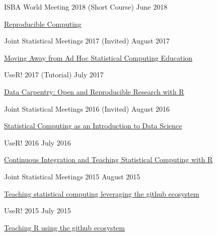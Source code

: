 \documentclass[margin,line]{res}
\begin{document}
\begin{resume}
ISBA World Meeting 2018 (Short Course) \hfill June 2018
\begin{list1}
\item[] \href{https://mine-cetinkaya-rundel.github.io/repro-compute-isba18/}{Reproducible Computing}
\end{list1}
\vspace{-2mm}

Joint Statistical Meetings 2017 (Invited) \hfill August 2017
\begin{list1}
\item[] \href{https://github.com/rundel/Presentations/tree/master/JSM%202017}{Moving Away from Ad Hoc Statistical Computing Education}
\end{list1}
\vspace{-2mm}

UseR! 2017 (Tutorial) \hfill July 2017
\begin{list1}
\item[] \href{https://github.com/fmichonneau/2017-useR-reproducibility/}{Data Carpentry: Open and Reproducible Research with R}
\end{list1}
\vspace{-2mm}

Joint Statistical Meetings 2016 (Invited) \hfill August 2016
\begin{list1}
\item[] \href{https://github.com/rundel/Presentations/tree/master/JSM%202016}{Statistical Computing as an Introduction to Data Science}
\end{list1}
\vspace{-2mm}

UseR! 2016 \hfill July 2016
\begin{list1}
\item[] \href{https://github.com/rundel/Presentations/tree/master/UseR2016}{Continuous Integration and Teaching Statistical Computing with R}
\end{list1}
\vspace{-2mm}


Joint Statistical Meetings 2015 \hfill August 2015
\begin{list1}
\item[] \href{https://github.com/rundel/Presentations/tree/master/JSM%202015}{Teaching statistical computing leveraging the github ecosystem}
\end{list1}
\vspace{-2mm}

UseR! 2015 \hfill July 2015
\begin{list1}
\item[] \href{https://github.com/rundel/Presentations/tree/master/UseR2015}{Teaching R using the github ecosystem}
\end{list1}
\vspace{-2mm}



\end{resume}
\end{document}
